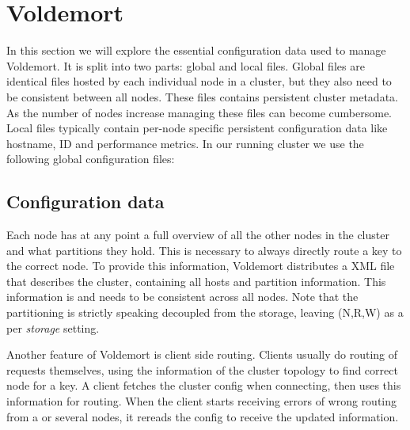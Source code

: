 \section{Voldemort}
\label{sec:voldemort}
In this section we will explore the essential configuration data used to manage Voldemort. It is split into two parts: global and local files. Global files are identical files hosted by each individual node in a cluster, but they also need to be consistent between all nodes. These files contains persistent cluster metadata. As the number of nodes increase managing these files can become cumbersome. Local files typically contain per-node specific persistent configuration data like hostname, ID and performance metrics. In our running cluster we use the following global configuration files:

\subsection{Configuration data}
Each node has at any point a full overview of all the other nodes in the cluster and what partitions they hold. This is necessary to always directly route a key to the correct node.
To provide this information, Voldemort distributes a XML file that describes the cluster, containing all hosts and partition information. This information is and needs to be consistent across all nodes.
Note that the partitioning is strictly speaking decoupled from the storage, leaving (N,R,W) as a per \emph{storage} setting.

Another feature of Voldemort is client side routing. Clients usually do routing of requests themselves, using the information of the cluster topology to find correct node for a key. A client fetches the cluster config when connecting, then uses this information for routing. When the client starts receiving errors of wrong routing from a or several nodes, it rereads the config to receive the updated information.

